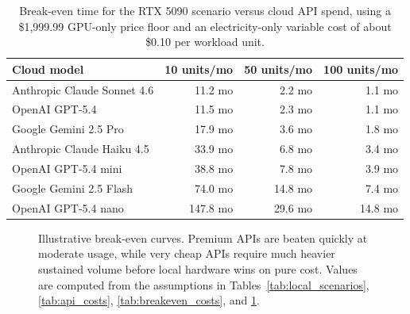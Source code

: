 \documentclass[11pt,a4paper]{article}
\begin{document}
\begin{table}[t]
\centering
\small
\begin{tabular}{>{\raggedright\arraybackslash}p{3.0cm} r r r}
\toprule
\textbf{Cloud model} & \textbf{10 units/mo} & \textbf{50 units/mo} & \textbf{100 units/mo} \\
\midrule
Anthropic Claude Sonnet 4.6 & 11.2 mo & 2.2 mo & 1.1 mo \\
OpenAI GPT-5.4 & 11.5 mo & 2.3 mo & 1.1 mo \\
Google Gemini 2.5 Pro & 17.9 mo & 3.6 mo & 1.8 mo \\
Anthropic Claude Haiku 4.5 & 33.9 mo & 6.8 mo & 3.4 mo \\
OpenAI GPT-5.4 mini & 38.8 mo & 7.8 mo & 3.9 mo \\
Google Gemini 2.5 Flash & 74.0 mo & 14.8 mo & 7.4 mo \\
OpenAI GPT-5.4 nano & 147.8 mo & 29.6 mo & 14.8 mo \\
\bottomrule
\end{tabular}
\caption{Break-even time for the RTX 5090 scenario versus cloud API spend, using a \$1,999.99 GPU-only price floor and an electricity-only variable cost of about \$0.10 per workload unit.}
\label{tab:breakeven_costs_5090}
\end{table}

\begin{figure}[t]
\centering
{}
\caption{Illustrative break-even curves. Premium APIs are beaten quickly at moderate usage, while very cheap APIs require much heavier sustained volume before local hardware wins on pure cost. Values are computed from the assumptions in Tables~\ref{tab:local_scenarios}, \ref{tab:api_costs}, \ref{tab:breakeven_costs}, and \ref{tab:breakeven_costs_5090}.}
\label{fig:breakeven_curves}
\end{figure}
\end{document}
